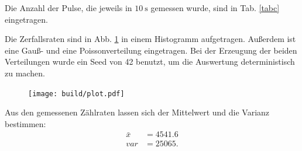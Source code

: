 Die Anzahl der Pulse, die jeweils in $\SI{10}{\second}$ gemessen wurde, sind in Tab. \ref{tabc} eingetragen.



Die Zerfallsraten sind in Abb. \ref{fig:histogramm} in einem Histogramm aufgetragen. Außerdem ist eine Gauß- und eine Poissonverteilung eingetragen. Bei der Erzeugung der beiden Verteilungen wurde ein Seed von 42 benutzt, um die Auswertung deterministisch zu machen. 
\begin{figure}
    \centering
    \texttt{[image: build/plot.pdf]}
    \caption{}
    \label{fig:histogramm}
\end{figure}

\noindent Aus den gemessenen Zählraten lassen sich der  Mittelwert und die Varianz bestimmen: %
\begin{align*}
    \bar{x} &= \num{4541.6} \\
    var &= \num{25065}.
\end{align*}
